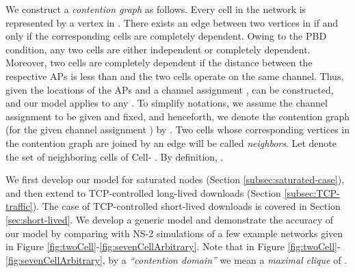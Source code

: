 \documentclass[10pt,a4paper,journal]{IEEEtran}
\theoremstyle{definition}
\theoremstyle{remark}
\theoremstyle{plain}
\begin{document}
We construct a \textit{contention graph}  as follows. Every cell in the network is represented by a vertex in . There exists an edge between two vertices in  if and only if the corresponding cells are completely dependent. Owing to the PBD condition, any two cells are either independent or completely dependent. Moreover, two cells are completely dependent if the distance between the respective APs is less than  and the two cells operate on the same channel. Thus, given the locations of the APs and a channel assignment ,  can be constructed, and our model applies to any . To simplify notations, we assume the channel assignment  to be given and fixed, and henceforth, we denote the contention graph  (for the given channel assignment ) by . Two cells whose corresponding vertices in the contention graph  are joined by an edge will be called \textit{neighbors}. Let  denote the set of neighboring cells of Cell- . By definition, .

We first develop our model for saturated nodes (Section \ref{subsec:saturated-case}), and then extend to TCP-controlled long-lived downloads (Section \ref{subsec:TCP-traffic}). The case of TCP-controlled short-lived downloads is covered in Section \ref{sec:short-lived}. We develop a generic model and demonstrate the accuracy of our model by comparing with NS-2 simulations of a few example networks given in Figure \ref{fig:twoCell}-\ref{fig:sevenCellArbitrary}. Note that in Figure \ref{fig:twoCell}-\ref{fig:sevenCellArbitrary}, by a \textit{``contention domain''} we mean a \textit{maximal clique} of . 
\end{document}
